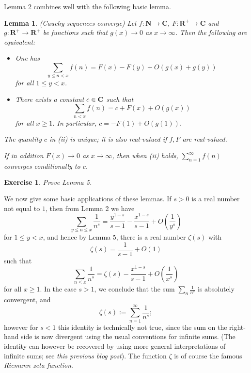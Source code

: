 \documentclass[10pt,reqno]{amsart}
\newtheorem{lemma}[theorem]{Lemma}
\newtheorem{exercise}[theorem]{Exercise}
\begin{document}
Lemma 2 combines well with the following basic lemma.

\begin{lemma} (Cauchy sequences converge)
    Let $f: \mathbf{N} \rightarrow \mathbf{C}$, $F: \mathbf{R}^+ \rightarrow \mathbf{C}$ and $g: \mathbf{R}^+ \rightarrow \mathbf{R}^+$ be functions such that $g(x) \rightarrow 0$ as $x \rightarrow \infty$. Then the following are equivalent:
    \begin{itemize}
        \item[(i)] One has
        \[ \sum_{y \leq n < x} f(n) = F(x) - F(y) + O( g(x) + g(y) ) \]
        for all $1 \leq y < x$.

        \item[(ii)] There exists a constant $c \in {\bf C}$ such that
        \[ \sum_{n < x} f(n) = c + F(x) + O( g(x) ) \]
        for all $x \geq 1$. In particular, $c = -F(1) + O(g(1))$.
    \end{itemize}
    The quantity $c$ in (ii) is unique; it is also real-valued if $f,F$ are real-valued.

    If in addition $F(x) \rightarrow 0$ as $x \rightarrow \infty$, then when (ii) holds, $\sum_{n=1}^\infty f(n)$ converges conditionally to $c$.
\end{lemma}

\begin{exercise}
    Prove Lemma 5.
\end{exercise}

We now give some basic applications of these lemmas. If $s>0$ is a real number not equal to $1$, then from Lemma 2 we have
%
\[ \sum_{y \leq n \leq x} \frac{1}{n^s} = \frac{y^{1-s}}{s-1} - \frac{x^{1-s}}{s-1} + O \left( \frac{1}{y^s} \right) \]
%
for $1 \leq y < x$, and hence by Lemma 5, there is a real number $\zeta(s)$ with
%
\begin{equation}
    \zeta(s) = \frac{1}{s-1} + O(1)
\end{equation}
%
such that
%
\begin{equation}
    \sum_{n \leq x} \frac{1}{n^s} = \zeta(s) - \frac{x^{1-s}}{s-1} + O \left( \frac{1}{x^s} \right)
\end{equation}
%
for all $x \geq 1$. In the case $s>1$, we conclude that the sum $\sum_n \frac{1}{n^s}$ is absolutely convergent, and
%
\[ \zeta(s) := \sum_{n=1}^\infty \frac{1}{n^s}; \]
%
however for $s<1$ this identity is technically not true, since the sum on the right-hand side is now divergent using the usual conventions for infinite sums. (The identity can however be recovered by using more general interpretations of infinite sums; see \emph{this previous blog post}). The function $\zeta$ is of course the famous \emph{Riemann zeta function}.
\end{document}
